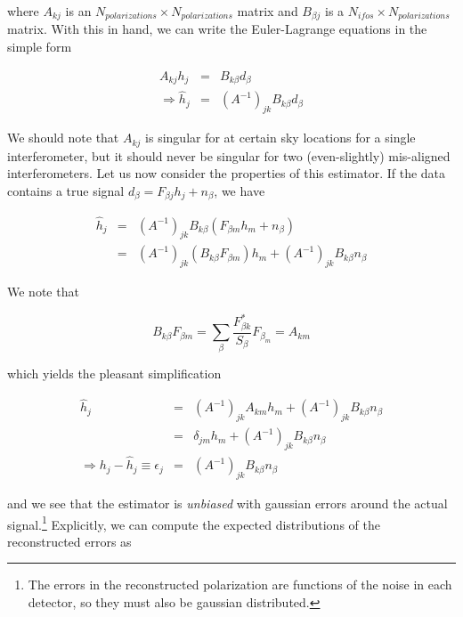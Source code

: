 \documentclass[10pt]{article}
\begin{document}
where $A_{kj}$ is an $N_{polarizations} \times N_{polarizations}$ matrix and $B_{\beta j}$ is a $N_{ifos} \times N_{polarizations}$ matrix. With this in hand, we can write the Euler-Lagrange equations in the simple form

\begin{eqnarray}
A_{kj}h_j & = & B_{k\beta}d_\beta \\
\Rightarrow \hat{h}_j & = & \left(A^{-1}\right)_{jk}B_{k\beta}d_\beta
\end{eqnarray}

We should note that $A_{kj}$ is singular for at certain sky locations for a single interferometer, but it should never be singular for two (even-slightly) mis-aligned interferometers. Let us now consider the properties of this estimator. If the data contains a true signal $d_\beta = F_{\beta j}h_j + n_\beta$, we have

\begin{eqnarray}
\hat{h}_j & = & \left(A^{-1}\right)_{jk}B_{k\beta}\left(F_{\beta m}h_m + n_\beta \right)\\
          & = & \left(A^{-1}\right)_{jk}\left(B_{k\beta}F_{\beta m}\right)h_m + \left(A^{-1}\right)_{jk}B_{k\beta}n_\beta
\end{eqnarray}

We note that 

\begin{equation}
B_{k\beta}F_{\beta m} = \sum_\beta \frac{F_{\beta k}^\ast}{S_\beta} F_{\beta_m} = A_{km}
\end{equation}

which yields the pleasant simplification

\begin{eqnarray}
\hat{h}_j & = & \left(A^{-1}\right)_{jk}A_{km} h_m + \left(A^{-1}\right)_{jk}B_{k\beta}n_\beta \\
          & = & \delta_{jm}h_m + \left(A^{-1}\right)_{jk}B_{k\beta}n_\beta \\
\Rightarrow h_j - \hat{h}_j \equiv \epsilon_j & = & \left(A^{-1}\right)_{jk}B_{k\beta}n_\beta 
\end{eqnarray}

and we see that the estimator is \emph{unbiased} with gaussian errors around the actual signal.\footnote{The errors in the reconstructed polarization are functions of the noise in each detector, so they must also be gaussian distributed.}
Explicitly, we can compute the expected distributions of the reconstructed errors as
\end{document}
